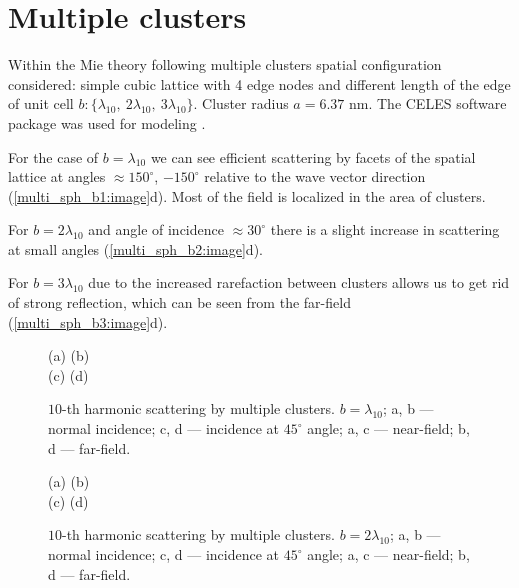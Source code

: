 \section{Multiple clusters}

Within the Mie theory following multiple clusters spatial configuration considered: simple cubic lattice with 4 edge nodes and different length of the edge of unit cell $b : \{\lambda_{10},\:2\lambda_{10},\:3\lambda_{10}\}$. Cluster radius $a = 6.37$ nm. The CELES software package was used for modeling \cite{celes}.

For the case of $b = \lambda_{10}$ we can see efficient scattering by facets of the spatial lattice at angles $\approx 150^{\circ}$, $-150^{\circ}$ relative to the wave vector direction (\autoref{multi_sph_b1:image}d). Most of the field is localized in the area of clusters.

For $b = 2\lambda_{10}$ and angle of incidence $\approx 30^{\circ}$ there is a slight increase in scattering at small angles (\autoref{multi_sph_b2:image}d).

For $b = 3\lambda_{10}$ due to the increased rarefaction between clusters allows us to get rid of strong reflection, which can be seen from the far-field (\autoref{multi_sph_b3:image}d).

\begin{figure}[H]
    (a)\:
    (b)\:
    \\(c)\:
    (d)\:
    \caption{$10$-th harmonic scattering by multiple clusters. $b = \lambda_{10}$; a, b --- normal incidence; c, d --- incidence at $45^{\circ}$ angle; a, c --- near-field; b, d --- far-field.}
    \label{multi_sph_b1:image}
\end{figure}

\begin{figure}[H]
    (a)\:
    (b)\:
    \\(c)\:
    (d)\:
    \caption{$10$-th harmonic scattering by multiple clusters. $b = 2\lambda_{10}$; a, b --- normal incidence; c, d --- incidence at $45^{\circ}$ angle; a, c --- near-field; b, d --- far-field.}
    \label{multi_sph_b2:image}
\end{figure}

